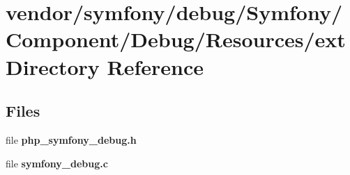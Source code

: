 \section{vendor/symfony/debug/\+Symfony/\+Component/\+Debug/\+Resources/ext Directory Reference}
\label{dir_3279f7ff04e08a5748a4ecde64202db8}
\subsection*{Files}
\begin{DoxyCompactItemize}
\item 
file {\bf php\+\_\+symfony\+\_\+debug.\+h}
\item 
file {\bf symfony\+\_\+debug.\+c}
\end{DoxyCompactItemize}
